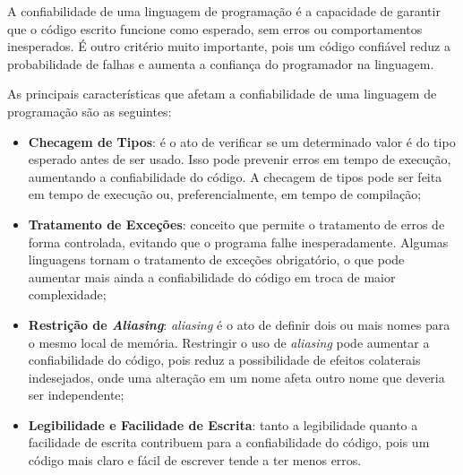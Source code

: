 
A confiabilidade de uma linguagem de programação é a capacidade de garantir que o código escrito funcione como esperado, sem erros ou comportamentos inesperados. É outro critério muito importante, pois um código confiável reduz a probabilidade de falhas e aumenta a confiança do programador na linguagem.

As principais características que afetam a confiabilidade de uma linguagem de programação são as seguintes:

\begin{itemize}
	\item \textbf{Checagem de Tipos}: é o ato de verificar se um determinado valor é do tipo esperado antes de ser usado. Isso pode prevenir erros em tempo de execução, aumentando a confiabilidade do código. A checagem de tipos pode ser feita em tempo de execução ou, preferencialmente, em tempo de compilação;
	\item \textbf{Tratamento de Exceções}: conceito que permite o tratamento de erros de forma controlada, evitando que o programa falhe inesperadamente. Algumas linguagens tornam o tratamento de exceções obrigatório, o que pode aumentar mais ainda a confiabilidade do código em troca de maior complexidade;
	\item \textbf{Restrição de \textit{Aliasing}}: \textit{aliasing} é o ato de definir dois ou mais nomes para o mesmo local de memória. Restringir o uso de \textit{aliasing} pode aumentar a confiabilidade do código, pois reduz a possibilidade de efeitos colaterais indesejados, onde uma alteração em um nome afeta outro nome que deveria ser independente;
	\item \textbf{Legibilidade e Facilidade de Escrita}: tanto a legibilidade quanto a facilidade de escrita contribuem para a confiabilidade do código, pois um código mais claro e fácil de escrever tende a ter menos erros.
\end{itemize}


